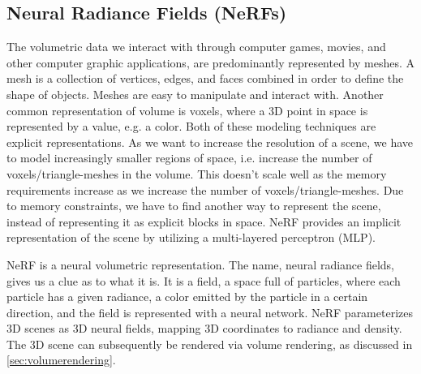 



\subsection{Neural Radiance Fields (NeRFs)}
The volumetric data we interact with through computer games, movies, and other computer graphic applications, are predominantly represented by meshes. A mesh is a collection of vertices, edges, and faces combined in order to define the shape of objects. Meshes are easy to manipulate and interact with. Another common representation of volume is voxels, where a 3D point in space is represented by a value, e.g. a color. Both of these modeling techniques are explicit representations. As we want to increase the resolution of a scene, we have to model increasingly smaller regions of space, i.e. increase the number of voxels/triangle-meshes in the volume. This doesn't scale well as the memory requirements increase as we increase the number of voxels/triangle-meshes. Due to memory constraints, we have to find another way to represent the scene, instead of representing it as explicit blocks in space. NeRF provides an implicit representation of the scene by utilizing a multi-layered perceptron (MLP).

NeRF is a neural volumetric representation. The name, neural radiance fields, gives us a clue as to what it is. It is a field, a space full of particles, where each particle has a given radiance, a color emitted by the particle in a certain direction, and the field is represented with a neural network. NeRF parameterizes 3D scenes as 3D neural fields, mapping 3D coordinates to radiance and density. The 3D scene can subsequently be rendered via volume rendering, as discussed in \autoref{sec:volumerendering}.


